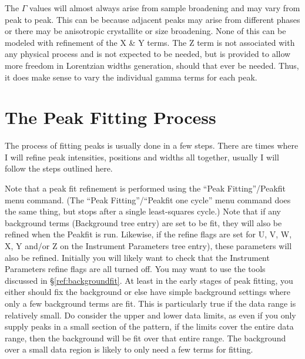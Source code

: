 The $\Gamma$ values will almost always arise from sample broadening and may vary from peak to peak. This can be because adjacent peaks may arise from different phases or there may be anisotropic crystallite or size broadening. None of this can be modeled with refinement of the X \& Y terms. The Z term is not associated with any physical process and is not expected to be needed, but is provided to allow more freedom in Lorentzian widths generation, should that ever be needed. Thus, it does make sense to vary the individual gamma terms for each peak. 

\section{The Peak Fitting Process}\label{ref:peakparameterorder}
The process of fitting peaks is usually done in a few steps. There are times where I will refine peak intensities, positions and widths all together, usually I will follow the steps outlined here. 

Note that a peak fit refinement is performed using the ``Peak Fitting''/Peakfit menu command. (The ``Peak Fitting''/``Peakfit one cycle'' menu command does the same thing, but stops after a single least-squares cycle.) Note that if any background terms (Background tree entry) are set to be fit, they will also be refined when the Peakfit is run. Likewise, if the refine flags are set for U, V, W, X, Y and/or Z on the Instrument Parameters tree entry), these parameters will also be refined. Initially you will likely want to check that the Instrument Parameters refine flags are all turned off. You may want to use the tools discussed in \S\ref{ref:backgroundfit}. At least in the early stages of peak fitting, you either should fix the background or else have simple background settings where only a few background terms are fit. This is particularly true if the data range is relatively small. Do consider the upper and lower data limits, as even if you only supply peaks in a small section of the pattern, if the limits cover the entire data range, then the background will be fit over that entire range. The background over a small data region is likely to only need a few terms for fitting. 

